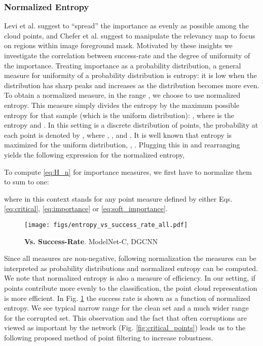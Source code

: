 \documentclass[10pt,twocolumn,letterpaper]{article}
\begin{document}
\subsubsection{Normalized Entropy}
Levi et al. \cite{epic} suggest to “spread” the importance as evenly as possible among the cloud points, and Chefer et al. \cite{relevancy_maps} suggest to manipulate the relevancy map to focus on regions within image foreground mask. Motivated by these insights we investigate the correlation between success-rate and the degree of uniformity of the importance. 
Treating importance as a probability distribution, a general measure for uniformity of a probability distribution is entropy: it is low when the distribution has sharp peaks and increases as the distribution becomes more even. To obtain a normalized measure, in the range , we choose to use normalized entropy. This measure simply divides the entropy by the maximum possible entropy for that sample (which is the uniform distribution): 
, where  is the entropy and . In this setting  is a discrete distribution of  points, the probability at each point is denoted by , where , , and  . It is well known that entropy is maximized for the uniform distribution, , . Plugging this in  and rearranging yields the following expression for 
the normalized entropy,

To compute \eqref{eq:H_n} for importance measures, we first have to normalize them to sum to one:

where  in this context stands for any point measure defined by either Eqs. \eqref{eq:critical}, \eqref{eq:importance} or \eqref{eq:soft_importance}.


\begin{figure}[ptbh!]
  \centering
\texttt{[image: figs/entropy\_vs\_success\_rate\_all.pdf]}
   \caption{{\bf  Vs. Success-Rate}. ModelNet-C\cite{modelnet_c}, DGCNN\cite{dgcnn}}
   \label{fig:entropy_vs_success_rate}
\end{figure}

Since all measures are non-negative, following normalization the measures can be interpreted as probability distributions and normalized entropy can be computed. We note that normalized entropy is also a measure of efficiency. In our setting, if points contribute more evenly to the classification, the point cloud representation is more efficient. 
In Fig. \ref{fig:entropy_vs_success_rate}
the success rate is shown as a function of normalized entropy.
We see typical narrow range for the clean set and a much wider range for the corrupted set.
This observation and the fact that often corruptions are viewed as important by the network (Fig. \ref{fig:critical_points}) leads us to the following proposed method of point filtering to increase robustness. 
\end{document}
